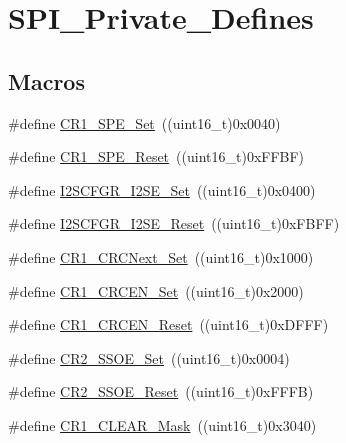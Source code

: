 \hypertarget{group___s_p_i___private___defines}{}\section{S\+P\+I\+\_\+\+Private\+\_\+\+Defines}
\label{group___s_p_i___private___defines}
\subsection*{Macros}
\begin{DoxyCompactItemize}
\item 
\#define \mbox{\hyperlink{group___s_p_i___private___defines_ga74286f403309d32b56fed10aba2ebf91}{C\+R1\+\_\+\+S\+P\+E\+\_\+\+Set}}~((uint16\+\_\+t)0x0040)
\item 
\#define \mbox{\hyperlink{group___s_p_i___private___defines_ga7074d384e7f175968d1497a9275232bf}{C\+R1\+\_\+\+S\+P\+E\+\_\+\+Reset}}~((uint16\+\_\+t)0x\+F\+F\+B\+F)
\item 
\#define \mbox{\hyperlink{group___s_p_i___private___defines_gaded516c1bc1f0cb578174af3e296621b}{I2\+S\+C\+F\+G\+R\+\_\+\+I2\+S\+E\+\_\+\+Set}}~((uint16\+\_\+t)0x0400)
\item 
\#define \mbox{\hyperlink{group___s_p_i___private___defines_ga0ba63ca824d68ed9a84eafd6f4d64a3a}{I2\+S\+C\+F\+G\+R\+\_\+\+I2\+S\+E\+\_\+\+Reset}}~((uint16\+\_\+t)0x\+F\+B\+F\+F)
\item 
\#define \mbox{\hyperlink{group___s_p_i___private___defines_gaed3a2181ca4095a6488cf6c0ad7a29c6}{C\+R1\+\_\+\+C\+R\+C\+Next\+\_\+\+Set}}~((uint16\+\_\+t)0x1000)
\item 
\#define \mbox{\hyperlink{group___s_p_i___private___defines_gae0b545cdda02753c8e8863e883268011}{C\+R1\+\_\+\+C\+R\+C\+E\+N\+\_\+\+Set}}~((uint16\+\_\+t)0x2000)
\item 
\#define \mbox{\hyperlink{group___s_p_i___private___defines_gadd72ac04e7b2ff17053db04d240e17b1}{C\+R1\+\_\+\+C\+R\+C\+E\+N\+\_\+\+Reset}}~((uint16\+\_\+t)0x\+D\+F\+F\+F)
\item 
\#define \mbox{\hyperlink{group___s_p_i___private___defines_gaae3c2720c0b63d7cc26046969a45a6c1}{C\+R2\+\_\+\+S\+S\+O\+E\+\_\+\+Set}}~((uint16\+\_\+t)0x0004)
\item 
\#define \mbox{\hyperlink{group___s_p_i___private___defines_ga475caaaef8732d35e4c6fd3f21dc4e3c}{C\+R2\+\_\+\+S\+S\+O\+E\+\_\+\+Reset}}~((uint16\+\_\+t)0x\+F\+F\+F\+B)
\item 
\#define \mbox{\hyperlink{group___s_p_i___private___defines_ga67f7dd35ea3d1296677e5fc50b88fa90}{C\+R1\+\_\+\+C\+L\+E\+A\+R\+\_\+\+Mask}}~((uint16\+\_\+t)0x3040)

\end{DoxyCompactItemize}
